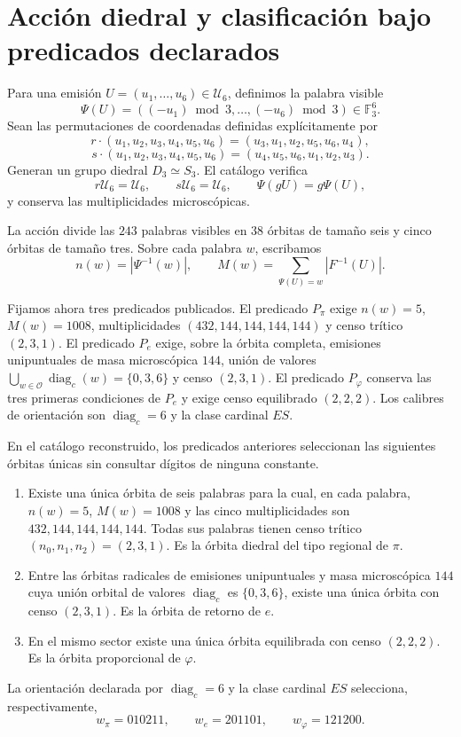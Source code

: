 \section{Acción diedral y clasificación bajo predicados declarados}

Para una emisión
\(U=(u_1,\ldots,u_6)\in\mathcal U_6\), definimos la palabra visible
\[
 \Psi(U)=((-u_1)\bmod3,\ldots,(-u_6)\bmod3)
 \in\mathbb F_3^6.
\]
Sean las permutaciones de coordenadas definidas explícitamente por
\[
 r\cdot(u_1,u_2,u_3,u_4,u_5,u_6)
 =(u_3,u_1,u_2,u_5,u_6,u_4),
\]
\[
 s\cdot(u_1,u_2,u_3,u_4,u_5,u_6)
 =(u_4,u_5,u_6,u_1,u_2,u_3).
\]
Generan
un grupo diedral \(D_3\simeq S_3\). El catálogo verifica
\[
 r\mathcal U_6=\mathcal U_6,
 \qquad
 s\mathcal U_6=\mathcal U_6,
 \qquad
 \Psi(gU)=g\Psi(U),
\]
y conserva las multiplicidades microscópicas.

La acción divide las \(243\) palabras visibles en \(38\) órbitas de tamaño
seis y cinco órbitas de tamaño tres. Sobre cada palabra \(w\), escribamos
\[
 n(w)=|\Psi^{-1}(w)|,
 \qquad
 M(w)=\sum_{\Psi(U)=w}|F^{-1}(U)|.
\]

Fijamos ahora tres predicados publicados. El predicado \(P_\pi\) exige
\(n(w)=5\), \(M(w)=1008\), multiplicidades
\((432,144,144,144,144)\) y censo trítico \((2,3,1)\). El predicado
\(P_e\) exige, sobre la órbita completa, emisiones unipuntuales de masa
microscópica \(144\), unión de valores 
\(\bigcup_{w\in\mathcal O}\operatorname{diag}_c(w)=\{0,3,6\}\) y censo
\((2,3,1)\). El predicado \(P_\varphi\) conserva las
tres primeras condiciones de \(P_e\) y exige censo equilibrado \((2,2,2)\).
Los calibres de orientación son \(\operatorname{diag}_c=6\) y la clase
cardinal \(ES\).

\begin{theorem}
\label{thm:selectores-orbitales-constantes}
En el catálogo reconstruido, los predicados anteriores seleccionan las
siguientes órbitas únicas sin consultar dígitos de ninguna constante.
\begin{enumerate}
  \item Existe una única órbita de seis palabras para la cual, en cada
  palabra, \(n(w)=5\), \(M(w)=1008\) y las cinco multiplicidades son
  \(432,144,144,144,144\). Todas sus palabras tienen censo trítico
  \((n_0,n_1,n_2)=(2,3,1)\). Es la órbita diedral del tipo regional de
  \(\pi\).
  \item Entre las órbitas radicales de emisiones unipuntuales y masa
  microscópica \(144\) cuya unión orbital de valores
  \(\operatorname{diag}_c\) es \(\{0,3,6\}\), existe una única
  órbita con censo \((2,3,1)\). Es la órbita de retorno de \(e\).
  \item En el mismo sector existe una única órbita equilibrada con censo
  \((2,2,2)\). Es la órbita proporcional de \(\varphi\).
\end{enumerate}
La orientación declarada por
\(\operatorname{diag}_c=6\) y la clase cardinal \(ES\) selecciona,
respectivamente,
\[
 \boxed{
 w_\pi=010211,
 \qquad
 w_e=201101,
 \qquad
 w_\varphi=121200.
 }
\]
\end{theorem}

